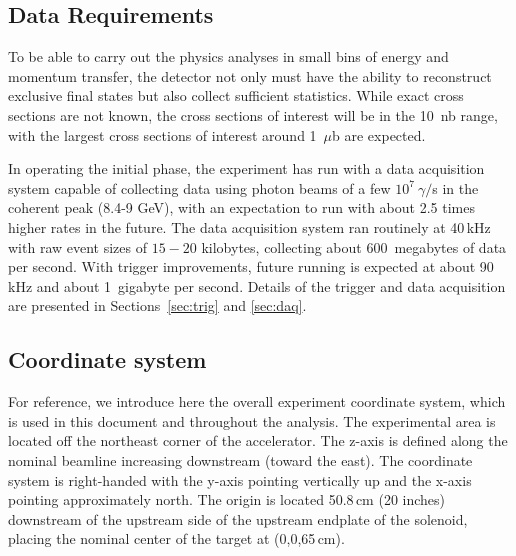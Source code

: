 \subsection{Data Requirements \label{sec:intro:data_requirements}}
To be able to carry out the physics analyses in small bins of energy and momentum transfer, the detector not only must have the ability to reconstruct exclusive final states but also collect sufficient statistics. While exact cross sections are not known, the cross sections of interest will be in the 10~nb range, with the largest cross sections of interest around 1~$\mu$b are expected. 

In operating the initial phase, the \GX{} experiment has run with a data acquisition system capable of collecting data using photon beams of a few $10^{7}~\gamma/$s in the coherent peak (8.4-9 GeV), with an expectation to run with about 2.5 times higher rates in the future. %
The data acquisition system ran routinely at 40\,kHz with raw event sizes of $15-20$ kilobytes, collecting about 600~megabytes of data per second. With trigger improvements, future running is expected at about 90 kHz and about 1~gigabyte per second. Details of the trigger and data acquisition are presented in Sections~\ref{sec:trig} and \ref{sec:daq}.

\subsection{Coordinate system \label{sec:intro:coordinates}}
For reference, we introduce here the overall experiment coordinate system, which is used in this document and throughout the analysis.
The experimental area is located 
off the northeast corner of the accelerator. The z-axis is defined along the nominal beamline increasing downstream (toward the east). The coordinate system 
is right-handed with the y-axis pointing vertically up and the x-axis pointing approximately north. 
The origin is located 50.8\,cm (20 inches) downstream of the upstream side of the upstream endplate of the solenoid, placing the nominal center of the target at (0,0,65\,cm).
